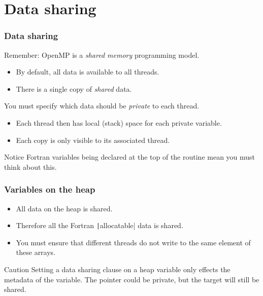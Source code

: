 \documentclass{beamer}
\begin{document}
\section{Data sharing}
\begin{frame}
\frametitle{Data sharing}
Remember: OpenMP is a \emph{shared memory} programming model.
\begin{itemize}
  \item By default, all data is available to all threads.
  \item There is a single copy of \emph{shared} data.
\end{itemize}

\vfill

You must specify which data should be \emph{private} to each thread.
\begin{itemize}
  \item Each thread then has local (stack) space for each private variable.
  \item Each copy is only visible to its associated thread.
\end{itemize}

\begin{block}{Notice}
Fortran variables being declared at the top of the routine mean you must think about this.
\end{block}

\end{frame}


\begin{frame}
\frametitle{Variables on the heap}
\begin{itemize}
  \item All data on the heap is shared.
  \item Therefore all the Fortran \texttt|allocatable| data is shared.
  \item You must ensure that different threads do not write to the same element of these arrays.
\end{itemize}

\begin{alertblock}{Caution}
Setting a data sharing clause on a heap variable only effects the metadata of the variable.
The pointer could be private, but the target will still be shared.
\end{alertblock}
\end{frame}

\end{document}

